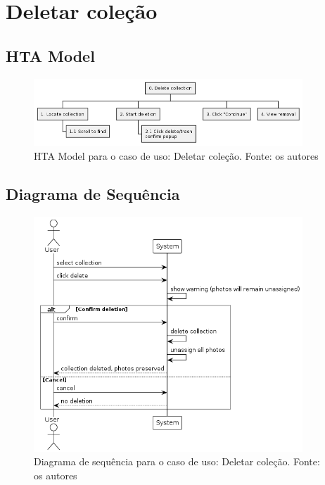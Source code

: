 \section{Deletar coleção}

\subsection{HTA Model}

\begin{figure}[H]
    \centering
    \includegraphics[width=0.9\textwidth]{../figures/hta/UC009.png}
    \caption{HTA Model para o caso de uso: Deletar coleção. Fonte: os autores}
    \label{fig:hta-uc009}
\end{figure}

\subsection{Diagrama de Sequência}

\begin{figure}[H]
    \centering
    \includegraphics[width=0.9\textwidth]{../figures/dss/UC009.png}
    \caption{Diagrama de sequência para o caso de uso: Deletar coleção. Fonte: os autores}
    \label{fig:dss-uc009}
\end{figure}

